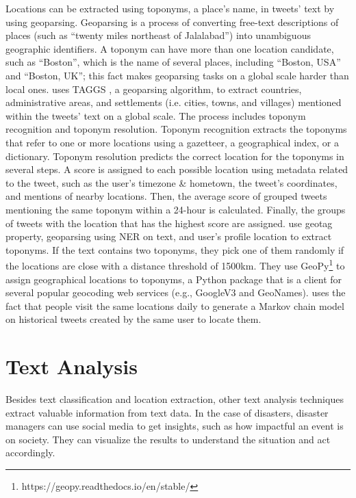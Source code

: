 Locations can be extracted using toponyms, a place's name, in tweets' text by using geoparsing.
Geoparsing is a process of converting free-text descriptions of places
(such as ``twenty miles northeast of Jalalabad'') into unambiguous geographic identifiers. A toponym
can have more than one location candidate, such as ``Boston'', which is the name of several places,
including ``Boston, USA'' and ``Boston, UK''; this fact makes geoparsing tasks on a global scale
harder than local ones.  uses TAGGS
\cite{debruijnTAGGSGroupingTweets2017}, a geoparsing algorithm, to extract countries,
administrative areas, and settlements (i.e. cities, towns, and villages) mentioned within the tweets'
text on a global scale. The process includes toponym recognition and toponym resolution.  Toponym
recognition extracts the toponyms that refer to one or more locations using a gazetteer, a
geographical index, or a dictionary. Toponym resolution predicts the correct location for the
toponyms in several steps. A score is assigned to each possible location using metadata related to
the tweet, such as the user's timezone \& hometown, the tweet's coordinates, and mentions of nearby
locations. Then, the average score of grouped tweets mentioning the same toponym within a
24-hour is calculated. Finally, the groups of tweets with the location that has the highest score are assigned.
 use geotag property, geoparsing using
\ac{NER} on text, and user's profile location to extract toponyms. If the text contains two
toponyms, they pick one of them randomly if the locations are close with a distance threshold of 1500km.
They use GeoPy\footnote{https://geopy.readthedocs.io/en/stable/} to assign geographical locations to
toponyms, a Python package that is a client for several popular geocoding web services (e.g.,
GoogleV3 and GeoNames).  uses the fact that people
visit the same locations daily to generate a Markov chain model on historical tweets created by the
same user to locate them.
 
\section{Text Analysis}

Besides text classification and location extraction, other text analysis techniques extract
valuable information from text data. In the case of disasters, disaster managers can use social
media to get insights, such as how impactful an event is on society. They can visualize the results
to understand the situation and act accordingly. 

